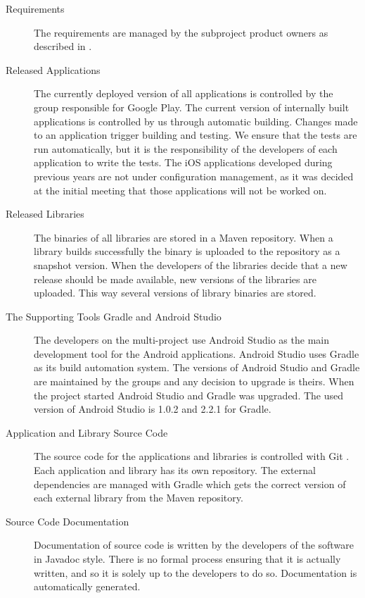 \begin{description}
  \item[Requirements] The requirements are managed by the subproject product owners as described in .
  \item[Released Applications] The currently deployed version of all applications is controlled by the group responsible for Google Play. The current version of internally built applications is controlled by us through automatic building. Changes made to an application trigger building and testing. We ensure that the tests are run automatically, but it is the responsibility of the developers of each application to write the tests. The iOS applications developed during previous years are not under configuration management, as it was decided at the initial meeting that those applications will not be worked on.
  \item[Released Libraries] The binaries of all libraries are stored in a Maven repository. When a library builds successfully the binary is uploaded to the repository as a snapshot version. When the developers of the libraries decide that a new release should be made available, new versions of the libraries are uploaded. This way several versions of library binaries are stored.
  \item[The Supporting Tools Gradle and Android Studio] The developers on the multi-project use Android Studio as the main development tool for the Android applications. Android Studio uses Gradle as its build automation system. The versions of Android Studio and Gradle are maintained by the \bd groups and any decision to upgrade is theirs. When the project started Android Studio and Gradle was upgraded. The used version of Android Studio is 1.0.2 and 2.2.1 for Gradle.
  \item[Application and Library Source Code] The source code for the applications and libraries is controlled with Git \parencite{gitwebsite}. Each application and library has its own repository. The external dependencies are managed with Gradle which gets the correct version of each external library from the Maven repository.
  \item[Source Code Documentation] Documentation of source code is written by the developers of the software in Javadoc style. There is no formal process ensuring that it is actually written, and so it is solely up to the developers to do so. Documentation is automatically generated.
\end{description}

